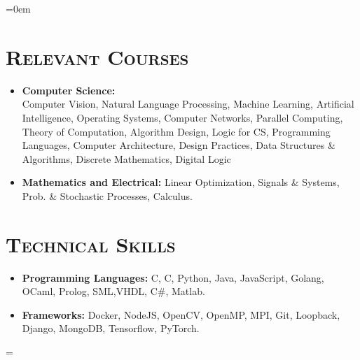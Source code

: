 \documentclass{article}
\newenvironment{longversion}{}{} %
\newenvironment{absolutelynopagebreak}
  {\par\nobreak\vfil\penalty0\vfilneg
   \vtop\bgroup}
  {\par\xdef\tpd{\the\prevdepth}\egroup
   \prevdepth=\tpd}
\newcommand{\CPP}
{C\nolinebreak[4]\hspace{-.05em}\raisebox{.22ex}{\footnotesize\bf ++}}
\newcommand{\tmpsection}[1]{}
\let\tmpsection=\section
\renewcommand{\section}[1]{\tmpsection*{\textsc{#1}}}
\begin{document}
\begin{absolutelynopagebreak}
\begin{longversion}
\begin{list} {}{\leftmargin=0em}
\end{list}


\end{longversion}

\begin{longversion}
\section{Relevant Courses}
\begin{itemize}
\setlength\itemsep{-1em}
\item \textbf{Computer Science:} \hfill \\
Computer Vision, Natural Language Processing, Machine Learning, Artificial Intelligence, Operating Systems, Computer Networks, Parallel Computing, Theory of Computation, Algorithm Design, Logic for CS, Programming Languages, Computer Architecture, Design Practices, Data Structures \& Algorithms, Discrete Mathematics, Digital Logic\\
\item \textbf{Mathematics and Electrical:}
Linear Optimization, Signals \& Systems, Prob. \& Stochastic Processes, Calculus.
\end{itemize}
\end{longversion}

\begin{longversion}
\section{Technical Skills}\begin{itemize}
\item \textbf{Programming Languages:}  C, \CPP, Python, Java, JavaScript, Golang, OCaml, Prolog, SML,VHDL, C\#, Matlab.
\item \textbf{Frameworks:} Docker, NodeJS, OpenCV, OpenMP, MPI, Git, Loopback, Django, MongoDB, Tensorflow, PyTorch.

\end{itemize}


\end{longversion}
\end{absolutelynopagebreak}
\end{document}
